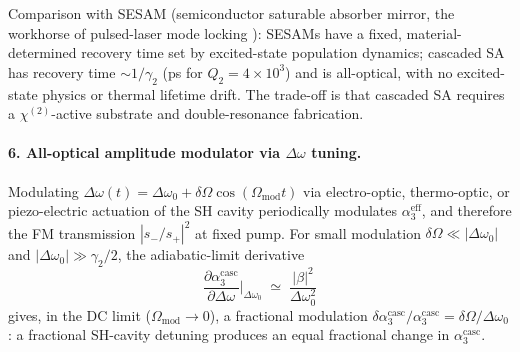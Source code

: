 \documentclass[11pt,a4paper]{article}
\newcommand{\chitwo}{\chi^{(2)}}
\newcommand{\Dom}{\Delta\omega}
\begin{document}
Comparison with SESAM (semiconductor saturable absorber mirror, the
workhorse of pulsed-laser mode locking \cite{Keller1996}): SESAMs have
a fixed, material-determined recovery time set by excited-state
population dynamics; cascaded SA has recovery time $\sim 1/\gamma_2$
(ps for
$Q_2=4{\times}10^{3}$) and is all-optical, with no excited-state
physics or thermal lifetime drift.  The trade-off is that cascaded SA
requires a $\chitwo$-active substrate and double-resonance fabrication.

\paragraph{6. All-optical amplitude modulator via $\Dom$ tuning.}
Modulating $\Dom(t)=\Dom_0+\delta\Omega\cos(\Omega_\text{mod}t)$ via
electro-optic, thermo-optic, or piezo-electric actuation of the SH
cavity periodically modulates $\alpha_3^\text{eff}$, and therefore
the FM transmission $|s_-/s_+|^{2}$ at fixed pump.  For small
modulation $\delta\Omega\ll|\Dom_0|$ and $|\Dom_0|\gg\gamma_2/2$,
the adiabatic-limit derivative
\begin{equation}
  \frac{\partial\alpha_3^\text{casc}}{\partial\Dom}\bigg|_{\Dom_0}
   \;\simeq\;\frac{|\beta|^{2}}{\Dom_0^{2}}
  \label{eq:dalpha-dDom}
\end{equation}
gives, in the DC limit ($\Omega_\text{mod}\to 0$), a fractional
modulation $\delta\alpha_3^\text{casc}/\alpha_3^\text{casc}=\delta\Omega/\Dom_0$:
a fractional SH-cavity detuning produces an equal fractional change
in $\alpha_3^\text{casc}$.
\end{document}
